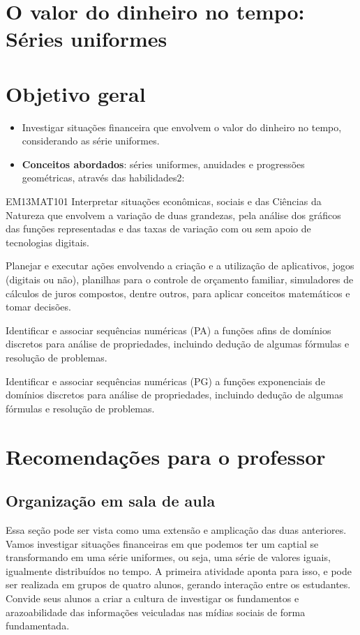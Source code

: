 \begin{paginatexto}\raggedcolumns
\section*{O valor do dinheiro no tempo: Séries uniformes}

\section*{Objetivo geral}
\begin{itemize}
\item Investigar situações financeira que envolvem o valor do dinheiro no tempo, considerando as série uniformes.

\item \textbf{Conceitos abordados}: séries uniformes, anuidades e progressões geométricas, através das habilidades2:
\end{itemize}

\begin{habilities}{EM13MAT101}
 Interpretar situações econômicas, sociais e das Ciências da Natureza
que envolvem a variação de duas grandezas, pela análise dos gráficos das funções representadas e das taxas de variação com ou sem apoio de tecnologias digitais.

Planejar e executar ações envolvendo a criação e a utilização de aplicativos, jogos (digitais ou não), planilhas para o controle de orçamento familiar, simuladores de cálculos de juros compostos, dentre outros, para aplicar conceitos matemáticos e tomar decisões. 

Identificar e associar sequências numéricas (PA) a funções afins de domínios discretos para análise de propriedades, incluindo dedução de algumas fórmulas e resolução de problemas.

Identificar e associar sequências numéricas (PG) a funções exponenciais de domínios discretos para análise de propriedades, incluindo dedução de algumas fórmulas e resolução de problemas.
\end{habilities}

\columnbreak

\section*{Recomendações para o professor}
\vspace{-1em}
\subsection{Organização em sala de aula} Essa seção pode ser vista como uma extensão e amplicação das duas anteriores. Vamos investigar situações financeiras em que podemos ter um captial se transformando em uma série uniformes, ou seja, uma série de valores iguais, igualmente distribuídos no tempo. A primeira atividade aponta para isso, e pode ser realizada em grupos de quatro alunos, gerando interação entre os estudantes. Convide seus alunos a criar a cultura de investigar os fundamentos e arazoabilidade das informações veiculadas nas mídias sociais de forma fundamentada.


\end{paginatexto}
